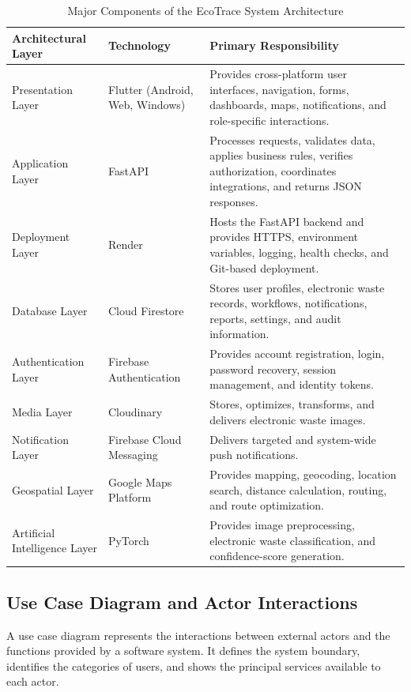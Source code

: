 \begin{table}[H]
\centering
\caption{Major Components of the EcoTrace System Architecture}
\label{tab:architecture-components}
\begin{tabular}{@{}p{2.6cm}p{3cm}p{7cm}@{}}
\toprule
\textbf{Architectural Layer} & \textbf{Technology} & \textbf{Primary Responsibility} \\
\midrule
Presentation Layer & Flutter (Android, Web, Windows) & Provides cross-platform user interfaces, navigation, forms, dashboards, maps, notifications, and role-specific interactions. \\
Application Layer & FastAPI & Processes requests, validates data, applies business rules, verifies authorization, coordinates integrations, and returns JSON responses. \\
Deployment Layer & Render & Hosts the FastAPI backend and provides HTTPS, environment variables, logging, health checks, and Git-based deployment. \\
Database Layer & Cloud Firestore & Stores user profiles, electronic waste records, workflows, notifications, reports, settings, and audit information. \\
Authentication Layer & Firebase Authentication & Provides account registration, login, password recovery, session management, and identity tokens. \\
Media Layer & Cloudinary & Stores, optimizes, transforms, and delivers electronic waste images. \\
Notification Layer & Firebase Cloud Messaging & Delivers targeted and system-wide push notifications. \\
Geospatial Layer & Google Maps Platform & Provides mapping, geocoding, location search, distance calculation, routing, and route optimization. \\
Artificial Intelligence Layer & PyTorch & Provides image preprocessing, electronic waste classification, and confidence-score generation. \\
\bottomrule
\end{tabular}
\end{table}

\subsection{Use Case Diagram and Actor Interactions}

A use case diagram represents the interactions between external actors and the
functions provided by a software system. It defines the system boundary,
identifies the categories of users, and shows the principal services available to
each actor.

